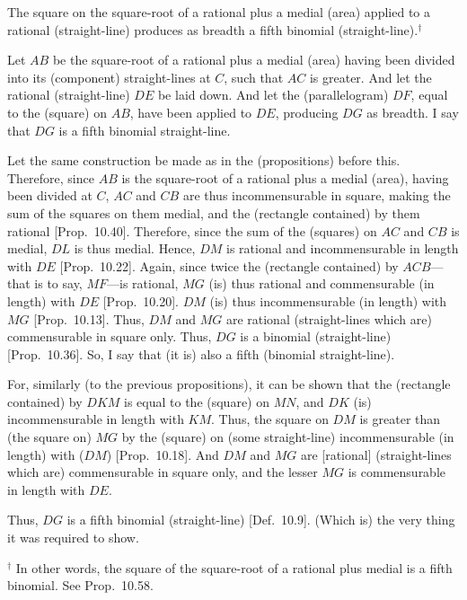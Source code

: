 \begin{Parallel}{}{}
{The square on the square-root of a rational
plus a medial (area) applied to a rational (straight-line) produces as breadth
a fifth binomial (straight-line).$^\dag$

Let $AB$ be the square-root of a rational plus a medial (area) having been divided
into its (component) straight-lines at $C$, such that $AC$ is greater. 
And let the rational (straight-line) $DE$ be laid down. And let the
(parallelogram) $DF$, equal to the (square) on $AB$, have been applied
to $DE$, producing $DG$ as breadth. I say that $DG$ is a fifth
binomial straight-line.

\epsfysize=1.5in 
\centerline{}

Let the same construction  be made as in the (propositions)
before this. Therefore, since $AB$ is the square-root of a
rational plus a medial (area), having been  divided at $C$, $AC$ and $CB$ are thus
incommensurable in square, making the sum of the squares on them
medial, and the (rectangle contained) by them rational [Prop.~10.40]. Therefore, since the
sum of the (squares) on $AC$ and $CB$ is medial, $DL$ is thus
medial. Hence, $DM$ is rational and incommensurable
in length with $DE$ [Prop.~10.22]. Again,
since twice the (rectangle contained) by $ACB$---that is to say,
$MF$---is rational, $MG$ (is) thus rational and commensurable
(in length) with $DE$ [Prop.~10.20]. 
$DM$ (is) thus incommensurable (in length) with $MG$ [Prop.~10.13]. Thus, $DM$ and $MG$
are rational (straight-lines which are) commensurable in square only. Thus,
$DG$ is a binomial (straight-line) [Prop.~10.36].
So, I say that (it is) also a fifth (binomial straight-line).

For, similarly (to the previous propositions), it can be shown that the
(rectangle contained) by $DKM$ is equal to the (square) on $MN$,
and $DK$ (is) incommensurable in length with $KM$. Thus, the
square on $DM$ is greater than (the square on) $MG$ by the (square)
on (some straight-line) incommensurable (in length) with ($DM$)
[Prop.~10.18]. And  $DM$ and $MG$
are [rational] (straight-lines which are) commensurable in square only,
and the lesser $MG$ is commensurable in length with $DE$.

Thus, $DG$ is a fifth binomial (straight-line) [Def.~10.9]. (Which is) the very thing it was required to show.}
\end{Parallel}
{\footnotesize\noindent$^\dag$ In other words, the square of the square-root of a rational plus medial  is a
fifth binomial. See Prop.~10.58.}

